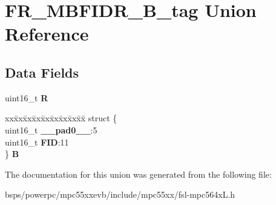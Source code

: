 \hypertarget{unionFR__MBFIDR__16B__tag}{}\section{F\+R\+\_\+\+M\+B\+F\+I\+D\+R\+\_\+B\+\_\+tag Union Reference}
\label{unionFR__MBFIDR__16B__tag}
\subsection*{Data Fields}
\begin{DoxyCompactItemize}
\item 
\mbox{\label{unionFR__MBFIDR__16B__tag_a8eb6a441356f76b01f97246368e86e09}} 
uint16\+\_\+t {\bfseries R}
\item 
\mbox{\label{unionFR__MBFIDR__16B__tag_a1c07ed0c5e182dbc2d280b9235ed5a3a}} 
\begin{tabbing}
xx\=xx\=xx\=xx\=xx\=xx\=xx\=xx\=xx\=\kill
struct \{\\
\>uint16\_t {\bfseries \_\_pad0\_\_}:5\\
\>uint16\_t {\bfseries FID}:11\\
\} {\bfseries B}\\

\end{tabbing}\end{DoxyCompactItemize}


The documentation for this union was generated from the following file\+:\begin{DoxyCompactItemize}
\item 
bsps/powerpc/mpc55xxevb/include/mpc55xx/fsl-\/mpc564x\+L.\+h\end{DoxyCompactItemize}
